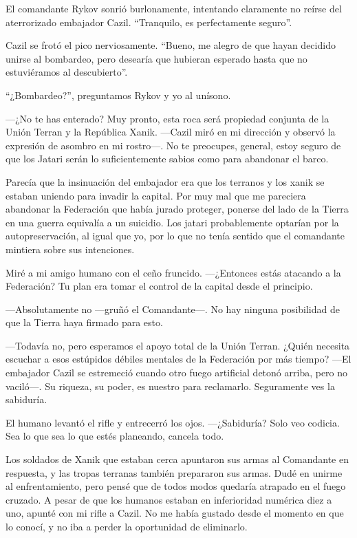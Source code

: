 El comandante Rykov sonrió burlonamente, intentando claramente no reírse del aterrorizado embajador Cazil. ``Tranquilo, es perfectamente seguro''.

Cazil se frotó el pico nerviosamente. ``Bueno, me alegro de que hayan decidido unirse al bombardeo, pero desearía que hubieran esperado hasta que no estuviéramos al descubierto''.

``¿Bombardeo?'', preguntamos Rykov y yo al unísono.

—¿No te has enterado? Muy pronto, esta roca será propiedad conjunta de la Unión Terran y la República Xanik. —Cazil miró en mi dirección y observó la expresión de asombro en mi rostro—. No te preocupes, general, estoy seguro de que los Jatari serán lo suficientemente sabios como para abandonar el barco.

Parecía que la insinuación del embajador era que los terranos y los xanik se estaban uniendo para invadir la capital. Por muy mal que me pareciera abandonar la Federación que había jurado proteger, ponerse del lado de la Tierra en una guerra equivalía a un suicidio. Los jatari probablemente optarían por la autopreservación, al igual que yo, por lo que no tenía sentido que el comandante mintiera sobre sus intenciones.

Miré a mi amigo humano con el ceño fruncido. —¿Entonces estás atacando a la Federación? Tu plan era tomar el control de la capital desde el principio.

—Absolutamente no —gruñó el Comandante—. No hay ninguna posibilidad de que la Tierra haya firmado para esto.

—Todavía no, pero esperamos el apoyo total de la Unión Terran. ¿Quién necesita escuchar a esos estúpidos débiles mentales de la Federación por más tiempo? —El embajador Cazil se estremeció cuando otro fuego artificial detonó arriba, pero no vaciló—. Su riqueza, su poder, es nuestro para reclamarlo. Seguramente ves la sabiduría.

El humano levantó el rifle y entrecerró los ojos. —¿Sabiduría? Solo veo codicia. Sea lo que sea lo que estés planeando, cancela todo.

Los soldados de Xanik que estaban cerca apuntaron sus armas al Comandante en respuesta, y las tropas terranas también prepararon sus armas. Dudé en unirme al enfrentamiento, pero pensé que de todos modos quedaría atrapado en el fuego cruzado. A pesar de que los humanos estaban en inferioridad numérica diez a uno, apunté con mi rifle a Cazil. No me había gustado desde el momento en que lo conocí, y no iba a perder la oportunidad de eliminarlo.

